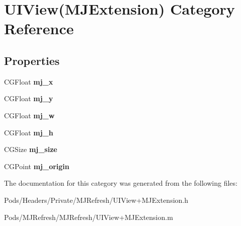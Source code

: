 \hypertarget{category_u_i_view_07_m_j_extension_08}{}\section{U\+I\+View(M\+J\+Extension) Category Reference}
\label{category_u_i_view_07_m_j_extension_08}
\subsection*{Properties}
\begin{DoxyCompactItemize}
\item 
\mbox{\label{category_u_i_view_07_m_j_extension_08_aee0828c2e48b73398c267eb1f045d6bc}} 
C\+G\+Float {\bfseries mj\+\_\+x}
\item 
\mbox{\label{category_u_i_view_07_m_j_extension_08_a0fc46b0853e0c8c1c25959b8f7611dc3}} 
C\+G\+Float {\bfseries mj\+\_\+y}
\item 
\mbox{\label{category_u_i_view_07_m_j_extension_08_a26f4c1f06dc27c1fea0a384d7f74aafe}} 
C\+G\+Float {\bfseries mj\+\_\+w}
\item 
\mbox{\label{category_u_i_view_07_m_j_extension_08_a4bce0247f8fa06cf3500cca970738f37}} 
C\+G\+Float {\bfseries mj\+\_\+h}
\item 
\mbox{\label{category_u_i_view_07_m_j_extension_08_a2b324b603002357aa421f60f8d853d8d}} 
C\+G\+Size {\bfseries mj\+\_\+size}
\item 
\mbox{\label{category_u_i_view_07_m_j_extension_08_a8c23ea2870b4d6436d77cc0f58b876d6}} 
C\+G\+Point {\bfseries mj\+\_\+origin}
\end{DoxyCompactItemize}


The documentation for this category was generated from the following files\+:\begin{DoxyCompactItemize}
\item 
Pods/\+Headers/\+Private/\+M\+J\+Refresh/U\+I\+View+\+M\+J\+Extension.\+h\item 
Pods/\+M\+J\+Refresh/\+M\+J\+Refresh/U\+I\+View+\+M\+J\+Extension.\+m\end{DoxyCompactItemize}
